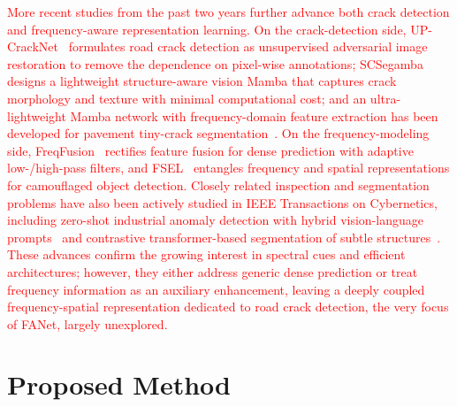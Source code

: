\documentclass[journal]{IEEEtran}
\begin{document}
\textcolor{red}{More recent studies from the past two years further advance both crack detection and frequency-aware representation learning. On the crack-detection side, UP-CrackNet~\cite{TITS24_UPCrackNet} formulates road crack detection as unsupervised adversarial image restoration to remove the dependence on pixel-wise annotations; SCSegamba~\cite{CVPR25_SCSegamba} designs a lightweight structure-aware vision Mamba that captures crack morphology and texture with minimal computational cost; and an ultra-lightweight Mamba network with frequency-domain feature extraction has been developed for pavement tiny-crack segmentation~\cite{ESWA25_MambaFreqCrack}. On the frequency-modeling side, FreqFusion~\cite{TPAMI24_FreqFusion} rectifies feature fusion for dense prediction with adaptive low-/high-pass filters, and FSEL~\cite{ECCV24_FSEL} entangles frequency and spatial representations for camouflaged object detection. Closely related inspection and segmentation problems have also been actively studied in IEEE Transactions on Cybernetics, including zero-shot industrial anomaly detection with hybrid vision-language prompts~\cite{TCYB25_AnomalyVLM} and contrastive transformer-based segmentation of subtle structures~\cite{TCYB24_CTNet}. These advances confirm the growing interest in spectral cues and efficient architectures; however, they either address generic dense prediction or treat frequency information as an auxiliary enhancement, leaving a deeply coupled frequency-spatial representation dedicated to road crack detection, the very focus of FANet, largely unexplored.}





\section{Proposed Method}
\end{document}
